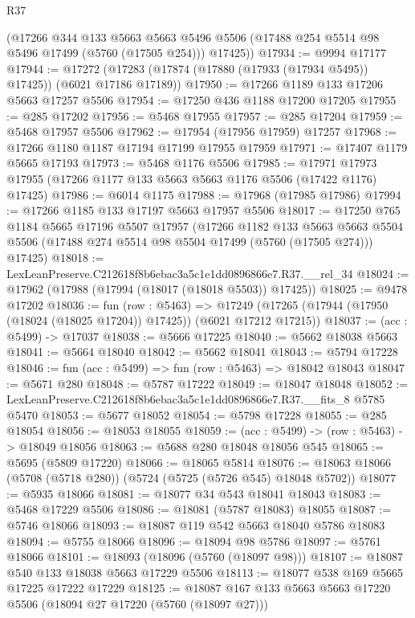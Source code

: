\begin{lexlean}{R37}
\begin{coremodule}
      (@17266
        @344
        @133
        @5663
        @5663
        @5496
        @5506
        (@17488 @254 @5514 @98 @5496 @17499 (@5760 (@17505 @254)))
        @17425))
@17934 := @9994 @17177
@17944 := @17272 (@17283 (@17874 (@17880 (@17933 (@17934 @5495)) @17425)) (@6021 @17186 @17189))
@17950 := @17266 @1189 @133 @17206 @5663 @17257 @5506
@17954 := @17250 @436 @1188 @17200 @17205
@17955 := @285 @17202
@17956 := @5468 @17955
@17957 := @285 @17204
@17959 := @5468 @17957 @5506
@17962 := @17954 (@17956 @17959) @17257
@17968 := @17266 @1180 @1187 @17194 @17199 @17955 @17959
@17971 := @17407 @1179 @5665 @17193
@17973 := @5468 @1176 @5506
@17985 := @17971 @17973 @17955 (@17266 @1177 @133 @5663 @5663 @1176 @5506 (@17422 @1176) @17425)
@17986 := @6014 @1175
@17988 := @17968 (@17985 @17986)
@17994 := @17266 @1185 @133 @17197 @5663 @17957 @5506
@18017 := @17250
    @765
    @1184
    @5665
    @17196
    @5507
    @17957
    (@17266
      @1182
      @133
      @5663
      @5663
      @5504
      @5506
      (@17488 @274 @5514 @98 @5504 @17499 (@5760 (@17505 @274)))
      @17425)
@18018 := LexLeanPreserve.C212618f8b6ebac3a5c1e1dd0896866e7.R37.__rel_34
@18024 := @17962 (@17988 (@17994 (@18017 (@18018 @5503)) @17425))
@18025 := @9478 @17202
@18036 := fun (row : @5463) =>
  @17249 (@17265 (@17944 (@17950 (@18024 (@18025 @17204)) @17425)) (@6021 @17212 @17215))
@18037 := (acc : @5499) -> @17037
@18038 := @5666 @17225
@18040 := @5662 @18038 @5663
@18041 := @5664 @18040
@18042 := @5662 @18041
@18043 := @5794 @17228
@18046 := fun (acc : @5499) => fun (row : @5463) => @18042 @18043
@18047 := @5671 @280
@18048 := @5787 @17222
@18049 := @18047 @18048
@18052 := LexLeanPreserve.C212618f8b6ebac3a5c1e1dd0896866e7.R37.__fits_8 @5785 @5470
@18053 := @5677 @18052
@18054 := @5798 @17228
@18055 := @285 @18054
@18056 := @18053 @18055
@18059 := (acc : @5499) -> (row : @5463) -> @18049 @18056
@18063 := @5688 @280 @18048 @18056 @545
@18065 := @5695 (@5809 @17220)
@18066 := @18065 @5814
@18076 := @18063 @18066 (@5708 (@5718 @280)) (@5724 (@5725 (@5726 @545) @18048 @5702))
@18077 := @5935 @18066
@18081 := @18077 @34 @543 @18041 @18043
@18083 := @5468 @17229 @5506
@18086 := @18081 (@5787 @18083) @18055
@18087 := @5746 @18066
@18093 := @18087 @119 @542 @5663 @18040 @5786 @18083
@18094 := @5755 @18066
@18096 := @18094 @98 @5786
@18097 := @5761 @18066
@18101 := @18093 (@18096 (@5760 (@18097 @98)))
@18107 := @18087 @540 @133 @18038 @5663 @17229 @5506
@18113 := @18077 @538 @169 @5665 @17225 @17222 @17229
@18125 := @18087 @167 @133 @5663 @5663 @17220 @5506 (@18094 @27 @17220 (@5760 (@18097 @27)))

\end{coremodule}
\end{lexlean}
